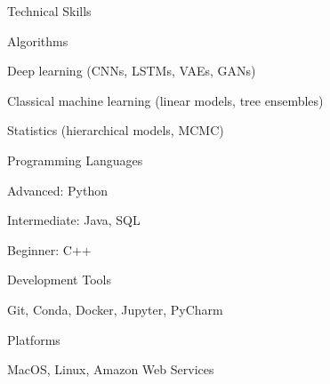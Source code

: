 \documentclass{resume} %
\begin{document}
\begin{rSection}{Technical Skills}

\begin{rSubsection}{Algorithms}{}{}{}
	\item Deep learning (CNNs, LSTMs, VAEs, GANs)
	\item Classical machine learning (linear models, tree ensembles)
	\item Statistics (hierarchical models, MCMC)
\end{rSubsection}
\begin{rSubsection}{Programming Languages}{}{}{}
	\item Advanced: Python
	\item Intermediate: Java, SQL
	\item Beginner: C++
\end{rSubsection}
\begin{rSubsection}{Development Tools}{}{}{}
	\item Git, Conda, Docker, Jupyter, PyCharm
\end{rSubsection}
\begin{rSubsection}{Platforms}{}{}{}
	\item MacOS, Linux, Amazon Web Services
\end{rSubsection}

\end{rSection}

\end{document}
